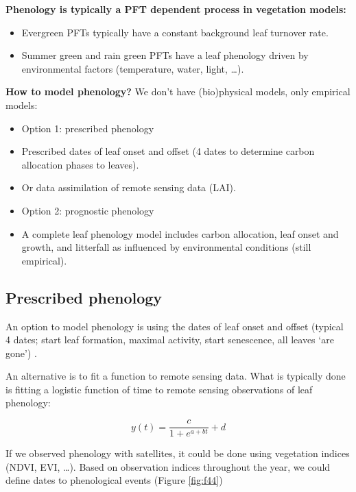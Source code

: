 \documentclass[12pt,oneside]{book}
\providecommand{\tightlist}{%
  \setlength{\itemsep}{0pt}\setlength{\parskip}{0pt}}
\begin{document}
\textbf{Phenology is typically a PFT dependent process in vegetation
models:}

\begin{itemize}
\tightlist
\item
  Evergreen PFTs typically have a constant background leaf turnover
  rate.
\item
  Summer green and rain green PFTs have a leaf phenology driven by
  environmental factors (temperature, water, light, \ldots{}).
\end{itemize}

\textbf{How to model phenology?} We don't have (bio)physical models,
only empirical models:

\begin{itemize}
\item
  Option 1: prescribed phenology
\item
  Prescribed dates of leaf onset and offset (4 dates to determine carbon
  allocation phases to leaves).
\item
  Or data assimilation of remote sensing data (LAI).
\item
  Option 2: prognostic phenology
\item
  A complete leaf phenology model includes carbon allocation, leaf onset
  and growth, and litterfall as influenced by environmental conditions
  (still empirical).
\end{itemize}

\subsection{Prescribed phenology}\label{prescribed-phenology}

An option to model phenology is using the dates of leaf onset and offset
(typical 4 dates; start leaf formation, maximal activity, start
senescence, all leaves `are gone') .

An alternative is to fit a function to remote sensing data. What is
typically done is fitting a logistic function of time to remote sensing
observations of leaf phenology:

\[
y(t)=\frac{c}{1+e^{a+bt}}+d
\]

If we observed phenology with satellites, it could be done using
vegetation indices (NDVI, EVI, \ldots{}). Based on observation indices
throughout the year, we could define dates to phenological events
(Figure \ref{fig:f44})
\end{document}
